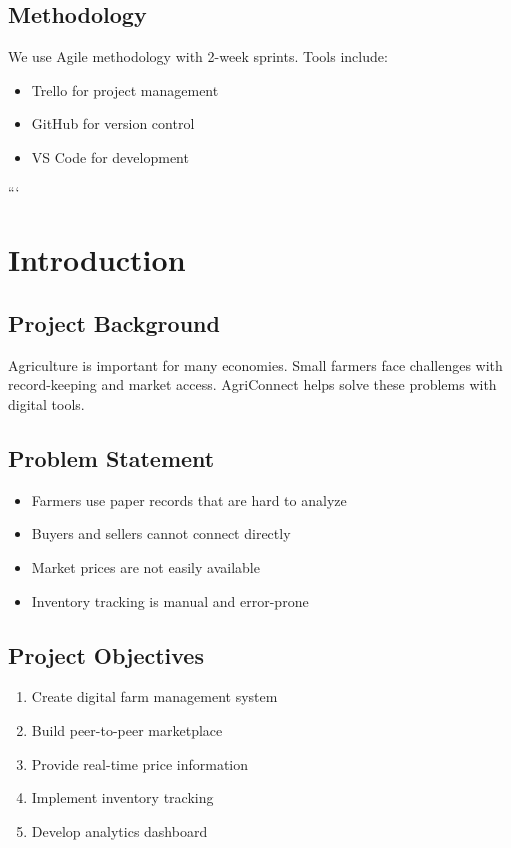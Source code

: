 \subsection{Methodology}
We use Agile methodology with 2-week sprints. Tools include:
\begin{itemize}[leftmargin=*]
    \item Trello for project management
    \item GitHub for version control
    \item VS Code for development
\end{itemize}
```
\section{Introduction}

\subsection{Project Background}
Agriculture is important for many economies. Small farmers face challenges with record-keeping and market access. AgriConnect helps solve these problems with digital tools.

\subsection{Problem Statement}
\begin{itemize}[leftmargin=*]
    \item Farmers use paper records that are hard to analyze
    \item Buyers and sellers cannot connect directly
    \item Market prices are not easily available
    \item Inventory tracking is manual and error-prone
\end{itemize}

\subsection{Project Objectives}
\begin{enumerate}[label=\arabic*., leftmargin=*]
    \item Create digital farm management system
    \item Build peer-to-peer marketplace
    \item Provide real-time price information
    \item Implement inventory tracking
    \item Develop analytics dashboard
\end{enumerate}

